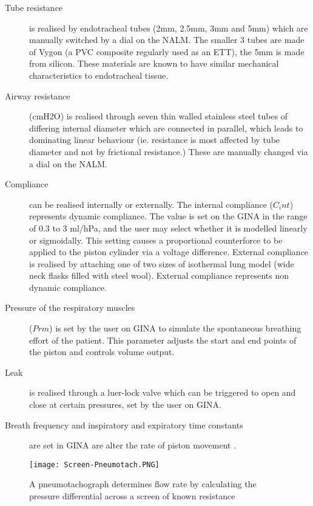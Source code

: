 \documentclass[12pt, openany, oneside]{book}
\begin{document}
\begin{description}
\item[Tube resistance] is realised by endotracheal tubes (2mm, 2.5mm, 3mm and 5mm) which are manually switched by a dial on the NALM. The smaller 3 tubes are made of Vygon (a PVC composite regularly used as an ETT), the 5mm is made from silicon. These materials are known to have similar mechanical characteristics to endotracheal tissue.
\item[Airway resistance] (cmH2O) is realised through seven thin walled stainless steel tubes of differing internal diameter which are connected in parallel, which leads to dominating linear behaviour (ie. resistance is most affected by tube diameter and not by frictional resistance.) These are manually changed via a dial on the NALM.
\item[Compliance] can be realised internally or externally. The internal compliance ($C_int$) represents dynamic compliance. The value is set on the GINA in the range of 0.3 to 3 ml/hPa, and the user may select whether it is modelled linearly or sigmoidally. This setting causes a proportional counterforce to be applied to the piston cylinder via a voltage difference. External compliance is realised by attaching one of two sizes of isothermal lung model (wide neck flasks filled with steel wool). External compliance represents non dynamic compliance.
\item[Pressure of the respiratory muscles] ($Prm$) is set by the user on GINA to simulate the spontaneous breathing effort of the patient. This parameter adjusts the start and end points of the piston and controls volume output.
\item[Leak] is realised through a luer-lock valve which can be triggered to open and close at certain pressures, set by the user on GINA.
\item[Breath frequency and inspiratory and expiratory time constants] are set in GINA are alter the rate of piston movement \citep{gina}.
\end{description}

\begin{figure}[h]
	\begin{center}	
		\texttt{[image: Screen-Pneumotach.PNG]}	
		\caption[Pneumotachograph]{A pneumotachograph determines flow rate by calculating the pressure differential across a screen of known resistance \citep{pneu}} 
		\label{fig:pneu}	
	
	\end{center}
\end{figure}
\end{document}
